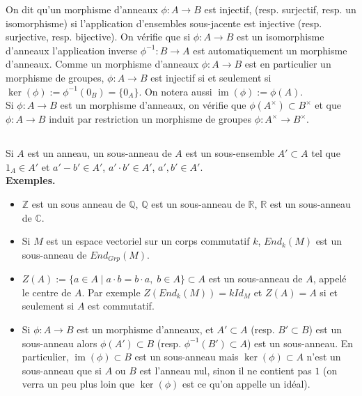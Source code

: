 \documentclass[a4paper, oneside, 12pt]{book}
\theoremstyle{definition} %
\DeclareMathOperator{\im}{im}
\newcommand{\Q}{\mathbb{Q}}
\newcommand{\C}{\mathbb{C}}
\newcommand{\Z}{\mathbb{Z}}
\newcommand{\R}{\mathbb{R}}
\begin{document}
 On dit qu'un morphisme d'anneaux $\phi:A\rightarrow B$ est injectif, (resp. surjectif, resp. un isomorphisme) si l'application d'ensembles sous-jacente est injective (resp. surjective, resp. bijective). On vérifie que si $\phi:A\rightarrow B$ est un isomorphisme d'anneaux l'application inverse $\phi^{-1}:B\rightarrow A$ est automatiquement un morphisme d'anneaux. Comme un morphisme d'anneaux $\phi:A\rightarrow B$ est en particulier un morphisme de groupes, $\phi:A\rightarrow B$ est injectif si et seulement si $\ker(\phi):=\phi^{-1}(0_B)=\lbrace 0_A\rbrace$. On notera aussi $\im(\phi):=\phi(A)$. \\

 Si $\phi:A\rightarrow B$ est un morphisme d'anneaux, on vérifie que $\phi(A^\times)\subset B^\times$ et que $\phi:A\rightarrow B$ induit par restriction un morphisme de groupes $\phi:A^\times\rightarrow B^\times$.

\subsection{}Si $A$ est un anneau, un sous-anneau de $A$ est un sous-ensemble $A'\subset A$ tel que $1_A\in A'$ et $a'-b'\in A'$, $a'\cdot b'\in A'$, $a',b'\in A'$. \\

\textbf{Exemples.}
\begin{itemize}[leftmargin=* ,parsep=0cm,itemsep=0cm,topsep=0cm]
\item $\Z$ est un sous anneau de $\Q$, $\Q$ est un sous-anneau de $\R$, $\R$ est un sous-anneau de $\C$. 
\item Si $M$ est un espace vectoriel sur un corps commutatif $k$, $End_k(M)$ est un sous-anneau de $End_{Grp}(M)$. 
\item $Z(A):=\lbrace a\in A\;|\; a\cdot b=b\cdot a,\; b\in A\rbrace\subset A$ est un sous-anneau de $A$, appelé le centre de $A$. Par exemple $Z(End_k(M))=kId_M$ et $Z(A)=A$ si et seulement si $A$ est commutatif. 
\item Si $\phi:A\rightarrow B$ est un morphisme d'anneaux, et $A'\subset A$ (resp. $B'\subset B$) est un sous-anneau alors $\phi(A')\subset B$ (resp. $\phi^{-1}(B')\subset A$) est un sous-anneau. En particulier, $\im(\phi)\subset B$ est un sous-anneau mais  $\ker(\phi)\subset A$ n'est un sous-anneau que si $A$ ou $B$ est l'anneau nul, sinon il ne contient pas $1$ (on verra un peu plus loin que $\ker(\phi)$ est ce qu'on appelle un idéal).
\end{itemize}
\end{document}
